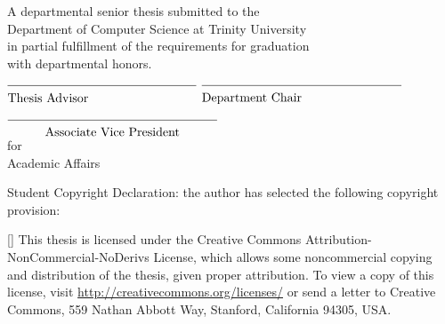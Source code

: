 \begin{singlespace}

\begin{center}

\textbf{\theTitle} 

\vspace*{\baselineskip}

\theAuthor 

\vspace*{\baselineskip}

A departmental senior thesis submitted to the \\
Department of Computer Science at Trinity University \\
in partial fulfillment of the requirements for graduation \\
with departmental honors. 

\vspace*{\baselineskip}

\theDate

\vfill

$\overline{\mbox{\rule{0in}{0.16in}Thesis Advisor~~~~~~~~~~~~~~~~~~~~~~~~~~}}$ 
\hfill
$\overline{\mbox{\rule{0in}{0.16in}Department Chair~~~~~~~~~~~~~~~~~~~~~~~~}}$ 

\vspace*{2\baselineskip}

$\overline{\mbox{\rule{0in}{0.16in}
~~~~~~~~Associate Vice President~~~~~~~~
}}$ \\
for \\
Academic Affairs

\end{center}

\vfill

\begin{small}

\settowidth{\WidthOfX}{X}

\noindent
Student Copyright Declaration: the author has selected the following
copyright provision:

\begin{TitlePageList}
\item{[\hspace*{\WidthOfX}]}
This thesis is licensed under the
Creative Commons Attribution-NonCommercial-NoDerivs License, which
allows some noncommercial copying and distribution of the thesis,
given proper attribution.  To view a copy of this license, visit
\url{http://creativecommons.org/licenses/} or send a letter to Creative
Commons, 559 Nathan Abbott Way, Stanford, California 94305, USA.


\end{TitlePageList}
\end{small}
\end{singlespace}

